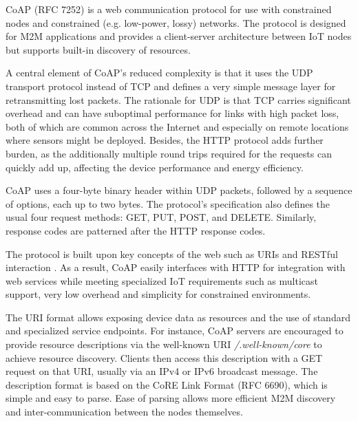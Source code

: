 CoAP \cite{bormann2012coap} (RFC 7252) is a web communication protocol for use with constrained nodes and constrained (e.g. low-power, lossy) networks. The protocol is designed for M2M applications and provides a client-server architecture between IoT nodes but supports built-in discovery of resources.

A central element of CoAP's reduced complexity is that it uses the UDP transport protocol instead of TCP and defines a very simple message layer for retransmitting lost packets. The rationale for UDP is that TCP carries significant overhead and can have suboptimal performance for links with high packet loss, both of which are common across the Internet \cite{nygren2010akamai} and especially on remote locations where sensors might be deployed. Besides, the HTTP protocol adds further burden, as the additionally multiple round trips required for the requests can quickly add up, affecting the device performance and energy efficiency.

CoAP uses a four-byte binary header within UDP packets, followed by a sequence of options, each up to two bytes. The protocol's specification also defines the usual four request methods: GET, PUT, POST, and DELETE. Similarly, response codes are patterned after the HTTP response codes.

The protocol is built upon key concepts of the web such as URIs and RESTful interaction \cite{pereira2013enabling}. As a result, CoAP easily interfaces with HTTP for integration with web services while meeting specialized IoT requirements such as multicast support, very low overhead and simplicity for constrained environments. 

The URI format allows exposing device data as resources and the use of standard and specialized service endpoints. For instance, CoAP servers are encouraged to provide resource descriptions via the well-known URI \emph{/.well-known/core} to achieve resource discovery. Clients then access this description with a GET request on that URI, usually via an IPv4 or IPv6 broadcast message. The description format is based on the CoRE Link Format (RFC 6690), which is simple and easy to parse. Ease of parsing allows more efficient M2M discovery and inter-communication between the nodes themselves.


